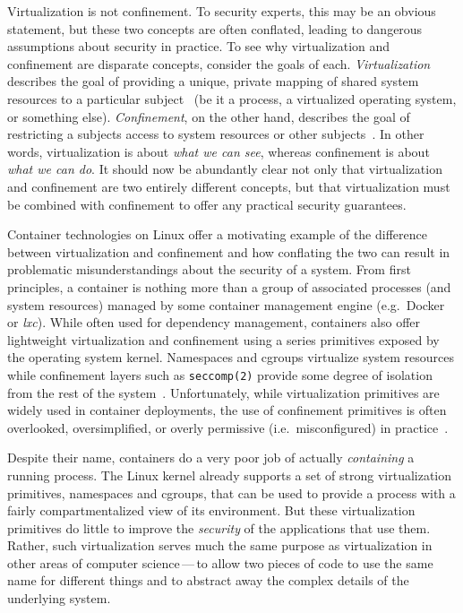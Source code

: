 \begin{inprogress}
Virtualization is not confinement. To security experts, this may be an obvious statement,
but these two concepts are often conflated, leading to dangerous assumptions about
security in practice. To see why virtualization and confinement are disparate concepts,
consider the goals of each. \textit{Virtualization} describes the goal of providing
a unique, private mapping of shared system resources to a particular subject~
(be it a process, a virtualized operating system, or something else).
\textit{Confinement}, on the other hand, describes the goal of restricting a subjects
access to system resources or other subjects~. In other words, virtualization
is about \textit{what we can see}, whereas confinement is about \textit{what we can do}.
It should now be abundantly clear not only that virtualization and confinement are two
entirely different concepts, but that virtualization must be combined with confinement to
offer any practical security guarantees.

Container technologies on Linux offer a motivating example of the difference between
virtualization and confinement and how conflating the two can result in problematic
misunderstandings about the security of a system. From first principles, a container is
nothing more than a group of associated processes (and system resources) managed by some
container management engine (e.g.~Docker or \textit{lxc}). While often used for dependency
management, containers also offer lightweight virtualization and confinement using
a series primitives exposed by the operating system kernel.  Namespaces and cgroups
virtualize system resources while confinement layers such as \texttt{seccomp(2)} provide
some degree of isolation from the rest of the system~. Unfortunately, while
virtualization primitives are widely used in container deployments, the use of confinement
primitives is often overlooked, oversimplified, or overly permissive (i.e.~misconfigured)
in practice~.

Despite their name, containers do a very poor job of actually \textit{containing}
a running process.  The Linux kernel already supports a set of strong virtualization
primitives, namespaces and cgroups, that can be used to provide a process with a fairly
compartmentalized view of its environment. But these virtualization primitives do little
to improve the \textit{security} of the applications that use them. Rather, such
virtualization serves much the same purpose as virtualization in other areas of computer
science\,---\,to allow two pieces of code to use the same name for different things and to
abstract away the complex details of the underlying system.


\end{inprogress}
